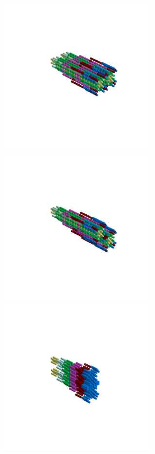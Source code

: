 \begin{minipage}[b]{0.50\linewidth}                                       
  \begin{figure}[H]
      \centering
        \vspace*{-1cm}
        \hspace*{-2cm}
        \includegraphics[width=8cm]{src/symmetries/pattern6_1-45.png}%
        \hspace*{-4cm}
        \includegraphics[width=8cm]{src/symmetries/pattern6_2-45.png}\\
        \vspace*{-5cm}
        \hspace*{-3cm}
        \includegraphics[width=8cm]{src/symmetries/pattern6_3-45.png}\\

\end{figure}
\end{minipage}
